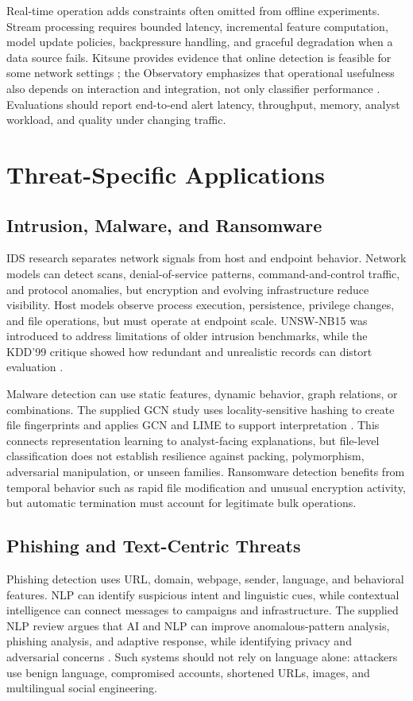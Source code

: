\documentclass[conference]{IEEEtran}
\begin{document}
Real-time operation adds constraints often omitted from offline experiments. Stream processing requires bounded latency, incremental feature computation, model update policies, backpressure handling, and graceful degradation when a data source fails. Kitsune provides evidence that online detection is feasible for some network settings \cite{Mirsky2018}; the Observatory emphasizes that operational usefulness also depends on interaction and integration, not only classifier performance \cite{Kaufhold2022}. Evaluations should report end-to-end alert latency, throughput, memory, analyst workload, and quality under changing traffic.

\section{Threat-Specific Applications}
\subsection{Intrusion, Malware, and Ransomware}
IDS research separates network signals from host and endpoint behavior. Network models can detect scans, denial-of-service patterns, command-and-control traffic, and protocol anomalies, but encryption and evolving infrastructure reduce visibility. Host models observe process execution, persistence, privilege changes, and file operations, but must operate at endpoint scale. UNSW-NB15 was introduced to address limitations of older intrusion benchmarks, while the KDD'99 critique showed how redundant and unrealistic records can distort evaluation \cite{Moustafa2015,Tavallaee2009}.

Malware detection can use static features, dynamic behavior, graph relations, or combinations. The supplied GCN study uses locality-sensitive hashing to create file fingerprints and applies GCN and LIME to support interpretation \cite{Balaji2025}. This connects representation learning to analyst-facing explanations, but file-level classification does not establish resilience against packing, polymorphism, adversarial manipulation, or unseen families. Ransomware detection benefits from temporal behavior such as rapid file modification and unusual encryption activity, but automatic termination must account for legitimate bulk operations.

\subsection{Phishing and Text-Centric Threats}
Phishing detection uses URL, domain, webpage, sender, language, and behavioral features. NLP can identify suspicious intent and linguistic cues, while contextual intelligence can connect messages to campaigns and infrastructure. The supplied NLP review argues that AI and NLP can improve anomalous-pattern analysis, phishing analysis, and adaptive response, while identifying privacy and adversarial concerns \cite{Ismail2024}. Such systems should not rely on language alone: attackers use benign language, compromised accounts, shortened URLs, images, and multilingual social engineering.
\end{document}
